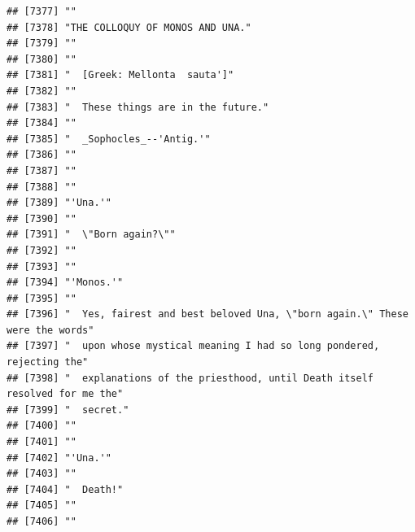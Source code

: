\documentclass{article}\usepackage[]{graphicx}\usepackage[]{color}
\makeatletter
\newenvironment{kframe}{%
 \def\at@end@of@kframe{}%
 \ifinner\ifhmode%
  \def\at@end@of@kframe{\end{minipage}}%
  \begin{minipage}{\columnwidth}%
 \fi\fi%
 \def\FrameCommand##1{\hskip\@totalleftmargin \hskip-\fboxsep
 \colorbox{shadecolor}{##1}\hskip-\fboxsep
     \hskip-\linewidth \hskip-\@totalleftmargin \hskip\columnwidth}%
 \MakeFramed {\advance\hsize-\width
   \@totalleftmargin\z@ \linewidth\hsize
   \@setminipage}}%
 {\par\unskip\endMakeFramed%
 \at@end@of@kframe}
\newenvironment{knitrout}{}{} %
\makeatother
\begin{document}
\begin{knitrout}
\begin{kframe}
\begin{verbatim}
## [7377] ""                                                                            
## [7378] "THE COLLOQUY OF MONOS AND UNA."                                              
## [7379] ""                                                                            
## [7380] ""                                                                            
## [7381] "  [Greek: Mellonta  sauta']"                                                 
## [7382] ""                                                                            
## [7383] "  These things are in the future."                                           
## [7384] ""                                                                            
## [7385] "  _Sophocles_--'Antig.'"                                                     
## [7386] ""                                                                            
## [7387] ""                                                                            
## [7388] ""                                                                            
## [7389] "'Una.'"                                                                      
## [7390] ""                                                                            
## [7391] "  \"Born again?\""                                                           
## [7392] ""                                                                            
## [7393] ""                                                                            
## [7394] "'Monos.'"                                                                    
## [7395] ""                                                                            
## [7396] "  Yes, fairest and best beloved Una, \"born again.\" These were the words"   
## [7397] "  upon whose mystical meaning I had so long pondered, rejecting the"         
## [7398] "  explanations of the priesthood, until Death itself resolved for me the"    
## [7399] "  secret."                                                                   
## [7400] ""                                                                            
## [7401] ""                                                                            
## [7402] "'Una.'"                                                                      
## [7403] ""                                                                            
## [7404] "  Death!"                                                                    
## [7405] ""                                                                            
## [7406] ""                                                                            

\end{verbatim}
\end{kframe}
\end{knitrout}
\end{document}
